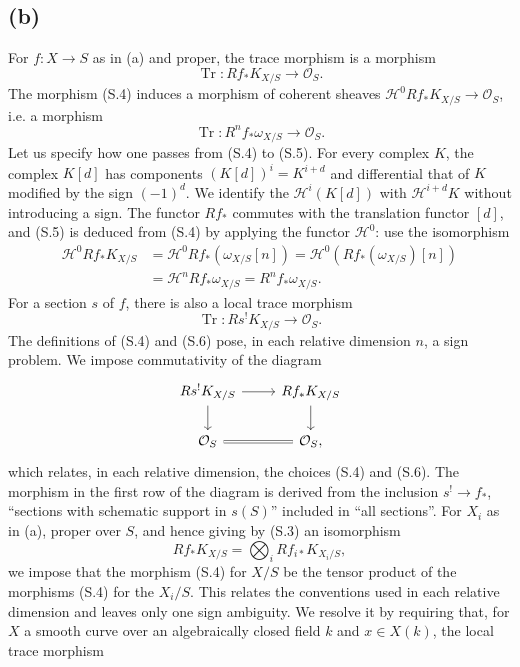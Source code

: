 \documentclass[11pt]{article}
\DeclareMathOperator{\Tr}{Tr}
\newcommand{\OO}{\mathcal O}
\begin{document}
\subsection*{(b)}
For $f:X\to S$ as in (a) and proper, the trace morphism is a morphism
\begin{equation}
        \Tr:Rf_*K_{X/S}\longrightarrow\OO_S. \tag{S.4}
\end{equation}
The morphism (S.4) induces a morphism of coherent sheaves $\mathcal H^0Rf_*K_{X/S}\to\OO_S$, i.e. a morphism
\begin{equation}
        \Tr:R^nf_*\omega_{X/S}\longrightarrow\OO_S. \tag{S.5}
\end{equation}
Let us specify how one passes from (S.4) to (S.5). For every complex $K$, the complex $K[d]$ has components $(K[d])^i=K^{i+d}$ and differential that of $K$ modified by the sign $(-1)^d$. We identify the $\mathcal H^i(K[d])$ with $\mathcal H^{i+d}K$ without introducing a sign. The functor $Rf_*$ commutes with the translation functor $[d]$, and (S.5) is deduced from (S.4) by applying the functor $\mathcal H^0$: use the isomorphism
\[
\begin{split}
\mathcal H^0 Rf_*K_{X/S}
&=\mathcal H^0 Rf_*(\omega_{X/S}[n])
=\mathcal H^0(Rf_*(\omega_{X/S})[n]) \\
&=\mathcal H^n Rf_*\omega_{X/S}=R^nf_*\omega_{X/S}.
\end{split}
\]
For a section $s$ of $f$, there is also a local trace morphism
\begin{equation}
        \Tr:Rs^!K_{X/S}\longrightarrow\OO_S. \tag{S.6}
\end{equation}
The definitions of (S.4) and (S.6) pose, in each relative dimension $n$, a sign problem. We impose commutativity of the diagram
\[
\begin{tikzcd}
Rs^!K_{X/S} \arrow[r] \arrow[d] & Rf_*K_{X/S} \arrow[d] \\
\OO_S \arrow[r,equal] & \OO_S,
\end{tikzcd}
\]
which relates, in each relative dimension, the choices (S.4) and (S.6). The morphism in the first row of the diagram is derived from the inclusion $s^!\to f_*$, ``sections with schematic support in $s(S)$'' included in ``all sections''. For $X_i$ as in (a), proper over $S$, and hence giving by (S.3) an isomorphism
\[
        Rf_*K_{X/S}=\bigotimes_iRf_{i*}K_{X_i/S},
\]
we impose that the morphism (S.4) for $X/S$ be the tensor product of the morphisms (S.4) for the $X_i/S$. This relates the conventions used in each relative dimension and leaves only one sign ambiguity. We resolve it by requiring that, for $X$ a smooth curve over an algebraically closed field $k$ and $x\in X(k)$, the local trace morphism
\end{document}
